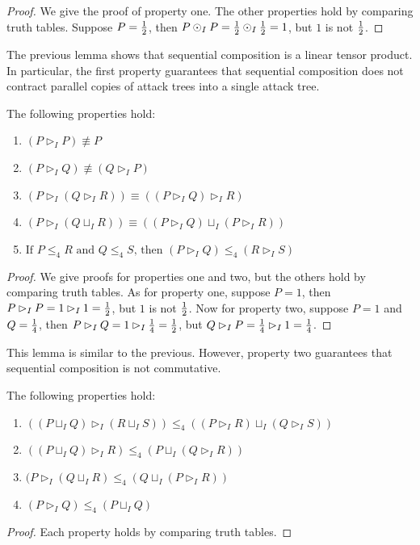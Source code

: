 \documentclass{llncs}
\begin{document}
\begin{proof}
  We give the proof of property one.  The other properties hold by
  comparing truth tables.  Suppose $P = \frac{1}{2}$, then $P \odot_I P =
  \frac{1}{2} \odot_I \frac{1}{2} = 1$, but $1$ is not $\frac{1}{2}$.
\end{proof}
The previous lemma shows that sequential composition is a linear
tensor product.  In particular, the first property guarantees that
sequential composition does not contract parallel copies of attack
trees into a single attack tree.
\begin{lemma}
  \label{lemma:basic_properties_for_parallel}
  The following properties hold:
  \begin{enumerate}
  \item $(P \rhd_I P) \not\equiv P$\\[-5px]
  \item $(P \rhd_I Q) \not\equiv (Q \rhd_I P)$\\[-5px]
  \item $(P \rhd_I (Q \rhd_I R)) \equiv ((P \rhd_I Q) \rhd_I R)$\\[-5px]
  \item $(P \rhd_I (Q \sqcup_I R)) \equiv ((P \rhd_I Q) \sqcup_I (P \rhd_I R))$\\[-5px]
  \item $\text{If }P \leq_4 R \text{ and } Q \leq_4 S \text{, then } (P \rhd_I Q) \leq_4 (R \rhd_I S)$
  \end{enumerate}
\end{lemma}
\begin{proof}
  We give proofs for properties one and two, but the others hold by
  comparing truth tables.  As for property one, suppose $P = 1$, then
  $P \rhd_I P = 1 \rhd_I 1 = \frac{1}{2}$, but $1$ is not $\frac{1}{2}$.  Now for
  property two, suppose $P = 1$ and $Q = \frac{1}{4}$, then $P \rhd_I Q = 1
  \rhd_I \frac{1}{4} = \frac{1}{2}$, but $Q \rhd_I P = \frac{1}{4} \rhd_I 1 = \frac{1}{4}$.
\end{proof}
This lemma is similar to the previous.  However, property two
guarantees that sequential composition is not commutative.
\begin{lemma}
  \label{lemma:the_ideal_properties}
  The following properties hold:
  \begin{enumerate}
  \item $((P \sqcup_I Q) \rhd_I (R \sqcup_I S)) \leq_4 ((P \rhd_I R) \sqcup_I (Q \rhd_I S))$\\[-5px]
  \item $((P \sqcup_I Q) \rhd_I R) \leq_4 (P \sqcup_I (Q \rhd_I R))$\\[-5px]
  \item $(P \rhd_I (Q \sqcup_I R) \leq_4 (Q \sqcup_I (P \rhd_I R))$\\[-5px]
  \item $(P \rhd_I Q) \leq_4 (P \sqcup_I Q)$
  \end{enumerate}
\end{lemma}
\begin{proof}
  Each property holds by comparing truth tables.
\end{proof}
\end{document}
